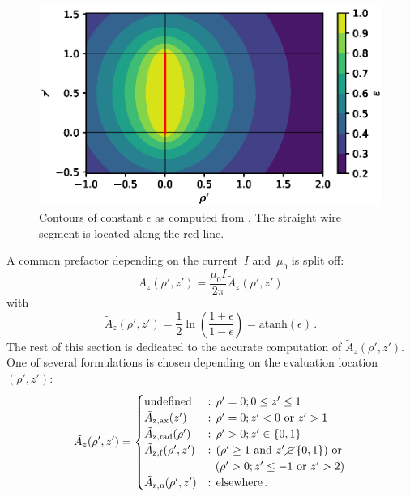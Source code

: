 \begin{figure}[htbp]
 \centering
 \includegraphics{img/epsilon_contours.eps}
 \caption{Contours of constant $\epsilon$ as computed from .
          The straight wire segment is located along the red line.}
 \label{fig:epsilon_contours}
\end{figure}
A common prefactor depending on the current~$I$ and~$\mu_0$ is split off:
\begin{equation}
  A_z(\rho', z') = \frac{\mu_0 I}{2 \pi} \tilde{A}_z (\rho', z')
\end{equation}
with
\begin{equation}
  \tilde{A}_z (\rho', z')
  = \frac{1}{2} \ln \left( \frac{1 + \epsilon}{1 - \epsilon} \right)
  = \textrm{atanh} (\epsilon) \, . \label{eqn:A_z_tilde}
\end{equation}
The rest of this section is dedicated to the accurate computation of $\tilde{A}_z (\rho', z')$.
One of several formulations is chosen depending on the evaluation location~$(\rho', z')$:
\begin{equation}
  \tilde{A}_z (\rho', z') =
  \begin{cases}
    \textrm{undefined}                   &:\, \rho' = 0; 0 \leq z' \leq 1 \\
    \tilde{A}_\mathrm{z,ax}  (z')        &:\, \rho' = 0; z' < 0 \textrm{ or } z' > 1  \\
    \tilde{A}_\mathrm{z,rad} (\rho')     &:\, \rho' > 0; z' \in \{0, 1\} \\
    \tilde{A}_\mathrm{z,f}   (\rho', z') &:\, (\rho' \geq 1 \textrm{ and } z' \,\cancel{\in}\, \{0, 1\}) \textrm{ or } \\
                ~                        &~\,\, (\rho' > 0; z' \leq -1 \textrm{ or } z' > 2) \\
    \tilde{A}_\mathrm{z,n}   (\rho', z') &:\, \textrm{elsewhere} \, .
  \end{cases} \label{eqn:sws_A_z_switchover}
\end{equation}

